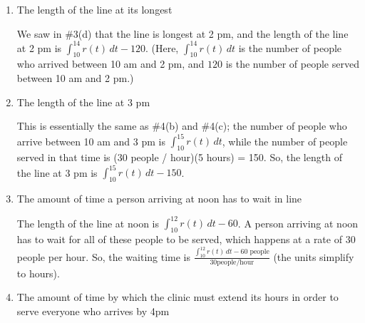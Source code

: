 \documentclass{article}
\begin{document}
\begin{enumerate}
\begin{enumerate}
  \item
\begin{problem}[\vfill]
      The length of the line at its longest
    \end{problem}

    \begin{solution} 
      We saw in {{{{\#3}}(d)}} that the line is longest at 2 pm,
      and the length of the line at 2 pm is $\boxed{\int_{10}^{14}
        r(t)\,dt - 120}$.  (Here, $\displaystyle \int_{10}^{14} r(t)\,dt$
      is the number of people who arrived between 10 am and 2 pm, and
      $120$ is the number of people served between 10 am and 2 pm.)
    \end{solution}

  \item
    \begin{problem}[\vfill]
      The length of the line at 3 pm
    \end{problem}

    \begin{solution} %
      This is essentially the same as {{{{\#4}}(b)}} and
      {{{{\#4}}(c)}}; the number of people who arrive between 10
      am and 3 pm is $\displaystyle \int_{10}^{15} r(t)\,dt$, while the
      number of people served in that time is (30 people / hour)(5 hours)
      = 150.  So, the length of the line at 3 pm is $\boxed{\int_{10}^{15}
        r(t)\,dt - 150}$.
    \end{solution}

  \item
    \begin{problem}[\vfill]
      The amount of time a person arriving at noon has to wait in line
    \end{problem}

    \begin{solution} %
      The length of the line at noon is $\displaystyle \int_{10}^{12}
      r(t)\,dt - 60$.  A person arriving at noon has to wait for all of
      these people to be served, which happens at a rate of 30 people per
      hour.  So, the waiting time is $\boxed{\frac{\displaystyle
          \int_{10}^{12} r(t)\,dt - 60 \text{ people}}{30 \text{
            people/hour}}}$ (the units simplify to hours).
    \end{solution}

  \item
    \begin{problem}[\vfill\newpage]
      The amount of time by which the clinic must extend its hours in
      order to serve everyone who arrives by 4pm
    \end{problem}


\end{enumerate}
\end{enumerate}
\end{document}
